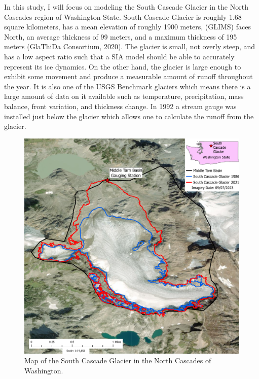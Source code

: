 \documentclass{article}
\begin{document}
In this study, I will focus on modeling the South Cascade Glacier in the North Cascades region of Washington State. South Cascade Glacier is 
roughly 1.68 square kilometers, has a mean elevation of roughly 1900 meters, (GLIMS) faces North, an average thickness of 99 meters, and a 
maximum thickness of 195 meters (GlaThiDa Consortium, 2020). The glacier is small, not overly steep, and has a low aspect ratio such that a 
SIA model should be able to accurately represent its ice dynamics. On the other hand, the glacier is large enough to exhibit some movement 
and produce a measurable amount of runoff throughout the year. It is also one of the USGS Benchmark glaciers which means there is a large 
amount of data on it available such as temperature, precipitation, mass balance, front variation, and thickness change. In 1992 a stream 
gauge was installed just below the glacier which allows one to calculate the runoff from the glacier. 
\begin{figure}[h!]
    \centering
    \includegraphics[width=\textwidth]{Plots/SouthCascadeGlacierMap.pdf}
    \caption{Map of the South Cascade Glacier in the North Cascades of Washington.}
    \label{fig:south_cascade_glacier}
\end{figure}
\FloatBarrier
\end{document}
